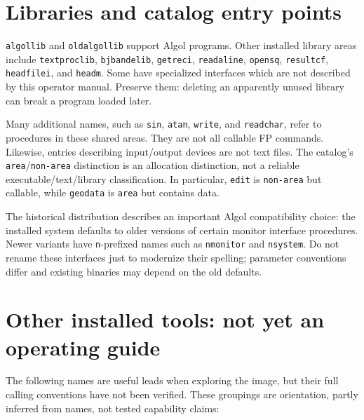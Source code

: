 \section{Libraries and catalog entry points}\label{libraries-and-catalog-entry-points}

\passthrough{\lstinline!algollib!} and \passthrough{\lstinline!oldalgollib!} support Algol programs. Other installed library areas include \passthrough{\lstinline!textproclib!}, \passthrough{\lstinline!bjbandelib!}, \passthrough{\lstinline!getreci!}, \passthrough{\lstinline!readaline!}, \passthrough{\lstinline!opensq!}, \passthrough{\lstinline!resultcf!}, \passthrough{\lstinline!headfilei!}, and \passthrough{\lstinline!headm!}. Some have specialized interfaces which are not described by this operator manual. Preserve them: deleting an apparently unused library can break a program loaded later.

Many additional names, such as \passthrough{\lstinline!sin!}, \passthrough{\lstinline!atan!}, \passthrough{\lstinline!write!}, and \passthrough{\lstinline!readchar!}, refer to procedures in these shared areas. They are not all callable FP commands. Likewise, entries describing input/output devices are not text files. The catalog's \passthrough{\lstinline!area!}/\passthrough{\lstinline!non-area!} distinction is an allocation distinction, not a reliable executable/text/library classification. In particular, \passthrough{\lstinline!edit!} is \passthrough{\lstinline!non-area!} but callable, while \passthrough{\lstinline!geodata!} is \passthrough{\lstinline!area!} but contains data.

The historical distribution describes an important Algol compatibility choice: the installed system defaults to older versions of certain monitor interface procedures. Newer variants have \passthrough{\lstinline!n!}-prefixed names such as \passthrough{\lstinline!nmonitor!} and \passthrough{\lstinline!nsystem!}. Do not rename these interfaces just to modernize their spelling; parameter conventions differ and existing binaries may depend on the old defaults.

\section{Other installed tools: not yet an operating guide}\label{other-installed-tools-not-yet-an-operating-guide}

The following names are useful leads when exploring the image, but their full calling conventions have not been verified. These groupings are orientation, partly inferred from names, not tested capability claims:

